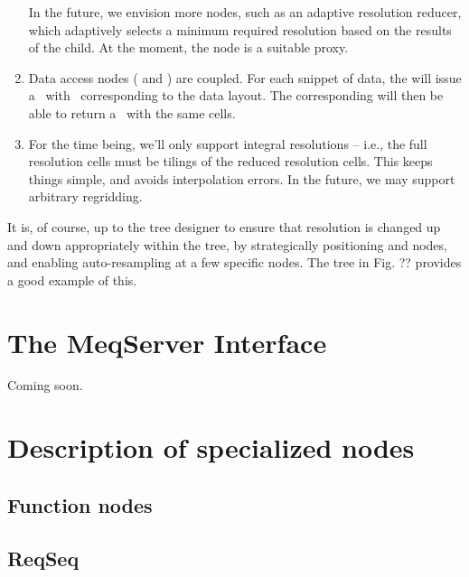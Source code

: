 \begin{enumerate}
\begin{description}
    \end{description}
    
  In the future, we envision more nodes, such as an adaptive resolution
  reducer, which adaptively selects a minimum required resolution based on the
  results of the child. At the moment, the  node is a suitable
  proxy. 

  \item Data access nodes ( and ) are coupled. For each
  snippet of data, the  will issue a \Request\ with \Cells\
  corresponding to the data layout. The corresponding  will then be
  able to return a \Result\ with the same cells.
  
  \item For the time being, we'll only support integral resolutions -- i.e.,
  the full resolution cells must be tilings of the reduced resolution cells.
  This keeps things simple, and avoids interpolation errors. In the future, we
  may support arbitrary regridding.

  \end{enumerate}
  
  It is, of course, up to the tree designer to ensure that resolution is
  changed up and down appropriately within the tree, by strategically
  positioning \qq{Resampler} and \qq{ModRes} nodes, and enabling
  auto-resampling at a few specific nodes. The tree in Fig. ?? provides a good
  example of this.

\chapter{The MeqServer Interface}
\label{chap:meqserver}
\label{sec:meqserver}
\label{sec:meqforest}

  Coming soon.

\chapter{Description of specialized nodes}

\section{Function nodes}
\label{sec:Function}

\section{ReqSeq}

